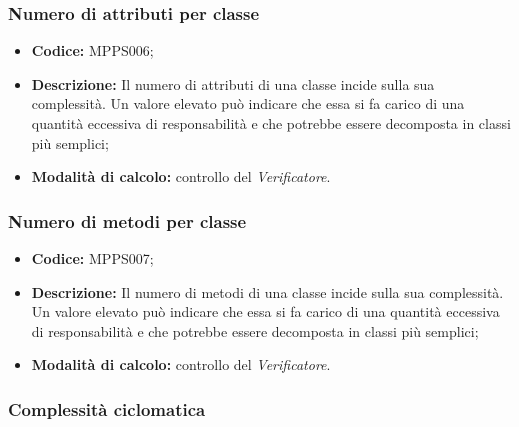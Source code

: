 \documentclass[../NormediProgetto.tex]{subfiles}
\begin{document}
\subsubsection{Numero di attributi per classe}

\begin{itemize}
	\item \textbf{Codice:} MPPS006;
	
	\item \textbf{Descrizione:} Il numero di attributi di una classe incide sulla sua complessità. Un valore elevato può indicare che essa si fa carico di una quantità eccessiva di responsabilità e che potrebbe essere decomposta in classi più semplici;
	
	\item \textbf{Modalità di calcolo:} controllo del \textit{Verificatore}.
\end{itemize}

\subsubsection{Numero di metodi per classe}

\begin{itemize}
	\item \textbf{Codice:} MPPS007;
	
	\item \textbf{Descrizione:} Il numero di metodi di una classe incide sulla sua complessità. Un valore elevato può indicare che essa si fa carico di una quantità eccessiva di responsabilità e che potrebbe essere decomposta in classi più semplici;
	
	\item \textbf{Modalità di calcolo:} controllo del \textit{Verificatore}.
\end{itemize}

\subsubsection{Complessità ciclomatica}
\end{document}
